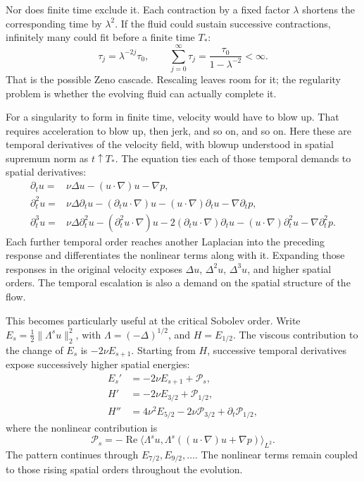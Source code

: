 Nor does finite time exclude it. Each contraction by a fixed factor
\(\lambda\) shortens the corresponding time by \(\lambda^2\). If the
fluid could sustain successive contractions, infinitely many could fit
before a finite time \(T_*\):
\[
 \tau_j=\lambda^{-2j}\tau_0,
 \qquad
 \sum_{j=0}^{\infty}\tau_j
 =\frac{\tau_0}{1-\lambda^{-2}}<\infty.
\]
That is the possible Zeno cascade. Rescaling leaves room for it; the
regularity problem is whether the evolving fluid can actually complete it.

For a singularity to form in finite time, velocity would have to blow up.
That requires acceleration to blow up, then jerk, and so on, and so on.
Here these are temporal derivatives of the velocity field, with blowup
understood in spatial supremum norm as \(t\uparrow T_*\). The equation
ties each of those temporal demands to spatial derivatives:
\[
 \begin{aligned}
 \partial_tu={}&\nu\Delta u-(u\cdot\nabla)u-\nabla p,\\
 \partial_t^2u={}&\nu\Delta\partial_tu
 -(\partial_tu\cdot\nabla)u
 -(u\cdot\nabla)\partial_tu-\nabla\partial_tp,\\
 \partial_t^3u={}&\nu\Delta\partial_t^2u
 -(\partial_t^2u\cdot\nabla)u
 -2(\partial_tu\cdot\nabla)\partial_tu
 -(u\cdot\nabla)\partial_t^2u
 -\nabla\partial_t^2p.
 \end{aligned}
\]
Each further temporal order reaches another Laplacian into the preceding
response and differentiates the nonlinear terms along with it. Expanding
those responses in the original velocity exposes \(\Delta u\),
\(\Delta^2u\), \(\Delta^3u\), and higher spatial orders. The temporal
escalation is also a demand on the spatial structure of the flow.

This becomes particularly useful at the critical Sobolev order. Write
\(E_s=\tfrac12\|\Lambda^su\|_2^2\), with
\(\Lambda=(-\Delta)^{1/2}\), and \(H=E_{1/2}\). The viscous contribution
to the change of \(E_s\) is \(-2\nu E_{s+1}\). Starting from \(H\),
successive temporal derivatives expose successively higher spatial energies:
\[
 \begin{aligned}
 E_s'&=-2\nu E_{s+1}+\mathcal P_s,\\
 H'&=-2\nu E_{3/2}+\mathcal P_{1/2},\\
 H''&=4\nu^2E_{5/2}-2\nu\mathcal P_{3/2}
       +\partial_t\mathcal P_{1/2},
 \end{aligned}
\]
where the nonlinear contribution is
\[
 \mathcal P_s=-\operatorname{Re}\langle\Lambda^su,
 \Lambda^s((u\cdot\nabla)u+\nabla p)\rangle_{L^2}.
\]
The pattern continues through \(E_{7/2},E_{9/2},\ldots\). The nonlinear
terms remain coupled to those rising spatial orders throughout the evolution.

